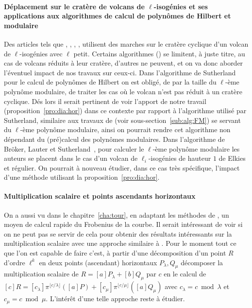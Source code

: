 \documentclass[10pt,a4paper]{book}
\theoremstyle{plain}
\theoremstyle{definition}
\theoremstyle{definition}
\theoremstyle{definition}
\theoremstyle{definition}
\theoremstyle{definition}
\theoremstyle{remark}
\theoremstyle{remark}
\theoremstyle{definition}
\begin{document}
\paragraph{Déplacement sur le cratère de volcans de $\ell$-isogénies et ses 
applications aux algorithmes de calcul de polynômes de Hilbert et modulaire}
Des articles tels que \cite{Couveignes96isogenycycles}, \cite{Broker08}, 
\cite{Sutherland11a}, \cite{BLS12}, utilisent des marches sur le cratère 
cyclique d'un volcan de $\ell$-isogénies avec $\ell$ petit. Certains 
algorithmes (\cite{Couveignes96isogenycycles}) se limitent, à juste titre, au 
cas de volcans réduits à leur cratère, d'autres ne peuvent, et on va donc 
aborder l'éventuel impact de nos travaux sur ceux-ci.
Dans l'algorithme de Sutherland~\cite{Sutherland11a} pour le calcul de polynômes
de Hilbert on est obligé, de par la taille du $\ell$-ème 
polynôme modulaire, de traiter les cas où le volcan n'est pas réduit à un
cratère cyclique. Dés lors il serait pertinent de voir l'apport de notre 
travail (proposition~\ref{pro:dia:hor}) dans ce contexte par rapport à 
l'algorithme utilisé par Sutherland, similaire aux travaux de 
\cite{FouquetMorain02} (voir sous-section~\ref{sub:alg:FM}) se servant
du $\ell$-ème polynôme modulaire, ainsi on pourrait rendre cet algorithme non
dépendant du (pré)calcul des polynômes modulaires.
Dans l'algorithme de Bröker, Lauter et Sutherland~\cite{BLS12}, pour 
calculer le $\ell$-ème polynôme modulaire les auteurs se placent dans le cas
d'un volcan de $\ell_i$-isogénies de hauteur $1$ de Elkies et régulier. 
On pourrait à nouveau étudier, dans ce cas très spécifique, l'impact d'une 
méthode utilisant la proposition~\ref{pro:dia:hor}.

\paragraph{Multiplication scalaire et points ascendants horizontaux}
On a aussi vu dans le chapitre~\ref{cha:tour}, en adaptant les méthodes de 
\cite{Doliskani-Schost15}, un moyen de calcul 
rapide du Frobenius de la courbe. Il serait intéressant de voir si on ne peut 
pas se servir de cela pour obtenir des résultats intéressants sur la 
multiplication scalaire avec une approche similaire à 
\cite{GallantLambertVanstone01}.
Pour le moment tout ce que l'on est capable de faire c'est, à partir d'une 
décomposition d'un point $R$ d'ordre $\ell^k$ en deux points (ascendant) 
horizontaux $P_{\lambda}, Q_{\mu}$ décomposer la multiplication scalaire de 
$R=[a]P_{\lambda} + [b] Q_{\mu}$ par $c$ en le calcul de $[c]R=[c_{\lambda}] 
\pi^{\lfloor c/\lambda \rfloor}([a]P)+[c_{\mu}]\pi^{\lfloor c/\mu \rfloor}
([a]Q_{\mu})$  avec $c_{\lambda}=c \bmod \lambda$ et $c_{\mu}=c \bmod \mu$. 
L'intérêt d'une telle approche reste à étudier.
\end{document}
